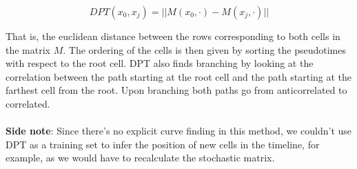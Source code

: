 \documentclass[11pt]{article}
\begin{document}
$$
DPT (x_0, x_j) = ||M(x_0, \cdot) - M(x_j, \cdot)||
$$

That is, the euclidean distance between the rows corresponding to both cells in the matrix $M$. The ordering of the cells is then given by sorting the pseudotimes with respect to the root cell. DPT also finds branching by looking at the correlation between the path starting at the root cell and the path starting at the farthest cell from the root. Upon branching both paths go from anticorrelated to correlated. \\
\\
\textbf{Side note}: Since there's no explicit curve finding in this method, we couldn't use DPT as a training set to infer the position of new cells in the timeline, for example, as we would have to recalculate the stochastic matrix.



\end{document}
